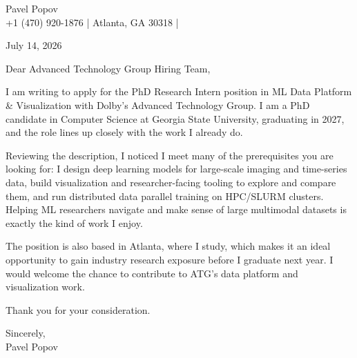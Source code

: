 \documentclass[11pt,a4paper]{article}
\begin{document}
\begin{center}
  {\Huge Pavel Popov}\\[0.5em]
  {\footnotesize +1 (470) 920-1876 \quad | \quad Atlanta, GA 30318} \quad | 
\end{center}

\vspace{1.5em}

July 14, 2026

\vspace{0.5em}

Dear Advanced Technology Group Hiring Team,

I am writing to apply for the PhD Research Intern position in ML Data Platform \& Visualization with Dolby's Advanced Technology Group. I am a PhD candidate in Computer Science at Georgia State University, graduating in 2027, and the role lines up closely with the work I already do.

Reviewing the description, I noticed I meet many of the prerequisites you are looking for: I design deep learning models for large-scale imaging and time-series data, build visualization and researcher-facing tooling to explore and compare them, and run distributed data parallel training on HPC/SLURM clusters. Helping ML researchers navigate and make sense of large multimodal datasets is exactly the kind of work I enjoy.

The position is also based in Atlanta, where I study, which makes it an ideal opportunity to gain industry research exposure before I graduate next year. I would welcome the chance to contribute to ATG's data platform and visualization work.

Thank you for your consideration.

\vspace{1em}

Sincerely,\\
Pavel Popov
\end{document}
